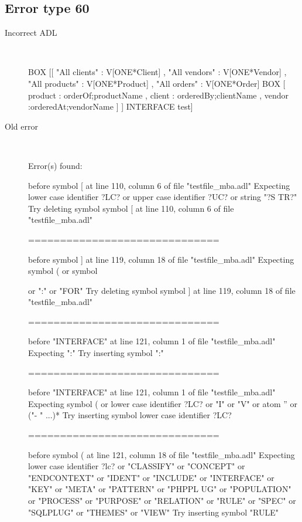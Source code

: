 \hrulefill

\subsection{Error type 60}
  \begin{description}
  \item[Incorrect ADL]~\\
\begin{adl}
BOX [[ "All clients"  : V[ONE*Client]
   , "All vendors"  : V[ONE*Vendor] 
   , "All products" : V[ONE*Product]
   , "All orders"   : V[ONE*Order]
     BOX [ product : orderOf;productName
         , client  : orderedBy;clientName
         , vendor  :orderedAt;vendorName
         ] 
   ]
   INTERFACE test]\end{adl}
  \item[Old error]~\\
\begin{haskell}
Error(s) found:

before symbol [ at line 110, column 6 of file "testfile_mba.adl"
Expecting lower case identifier ?LC? or upper case identifier ?UC? or string "?S
TR?"
Try deleting symbol symbol [ at line 110, column 6 of file "testfile_mba.adl"

==============================

before symbol ] at line 119, column 18 of file "testfile_mba.adl"
Expecting symbol ( or symbol { or ":" or "FOR"
Try deleting symbol symbol ] at line 119, column 18 of file "testfile_mba.adl"

==============================

before "INTERFACE" at line 121, column 1 of file "testfile_mba.adl"
Expecting ":"
Try inserting symbol ":"

==============================

before "INTERFACE" at line 121, column 1 of file "testfile_mba.adl"
Expecting symbol ( or lower case identifier ?LC? or "I" or "V" or atom '' or ("-
" ...)*
Try inserting symbol lower case identifier ?LC?

==============================

before symbol ( at line 121, column 18 of file "testfile_mba.adl"
Expecting lower case identifier ?lc? or "CLASSIFY" or "CONCEPT" or "ENDCONTEXT"
or "IDENT" or "INCLUDE" or "INTERFACE" or "KEY" or "META" or "PATTERN" or "PHPPL
UG" or "POPULATION" or "PROCESS" or "PURPOSE" or "RELATION" or "RULE" or "SPEC"
or "SQLPLUG" or "THEMES" or "VIEW"
Try inserting symbol "RULE"

}
\end{haskell}
\end{description}
